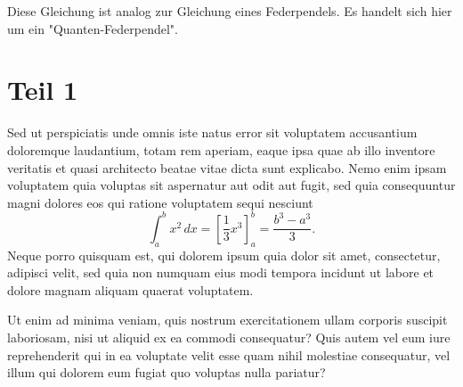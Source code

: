 


Diese Gleichung ist analog zur Gleichung eines Federpendels.
Es handelt sich hier um ein "Quanten-Federpendel".

    
    
    
    
    


\section{Teil 1
\label{fourier:section:teil1}}
Sed ut perspiciatis unde omnis iste natus error sit voluptatem
accusantium doloremque laudantium, totam rem aperiam, eaque ipsa
quae ab illo inventore veritatis et quasi architecto beatae vitae
dicta sunt explicabo.
Nemo enim ipsam voluptatem quia voluptas sit aspernatur aut odit
aut fugit, sed quia consequuntur magni dolores eos qui ratione
voluptatem sequi nesciunt
\begin{equation}
\int_a^b x^2\, dx
=
\left[ \frac13 x^3 \right]_a^b
=
\frac{b^3-a^3}3.
\label{fourier:equation1}
\end{equation}
Neque porro quisquam est, qui dolorem ipsum quia dolor sit amet,
consectetur, adipisci velit, sed quia non numquam eius modi tempora
incidunt ut labore et dolore magnam aliquam quaerat voluptatem.

Ut enim ad minima veniam, quis nostrum exercitationem ullam corporis
suscipit laboriosam, nisi ut aliquid ex ea commodi consequatur?
Quis autem vel eum iure reprehenderit qui in ea voluptate velit
esse quam nihil molestiae consequatur, vel illum qui dolorem eum
fugiat quo voluptas nulla pariatur?

